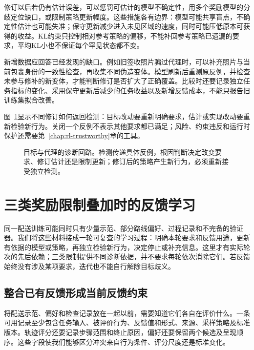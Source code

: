修订以后若仍有估计误差，可以惩罚可估计的模型不确定性，用多个奖励模型的分歧定位缺口，或限制策略更新幅度。这些措施各有边界：模型可能共享盲点，不确定性估计也可能失准；保守更新减少进入未见区域的速度，同时可能压低原本可获得的收益。KL约束只控制相对参考策略的偏移，不能补回参考策略已遗漏的要求，平均KL小也不保证每个罕见状态都不变。

新增数据应回答已经发现的缺口。例如旧签收照片骗过代理时，可以补充照片与当前包裹身份的一致性检查，再收集不同伪造变体。模型刷新后重测原反例，并检查未参与修补的新变体，才能判断修订是否扩大了正确覆盖。比较时还要记录独立任务指标的变化、采用保守更新后减少的任务收益以及新增反馈成本，不能只报告旧训练集拟合改善。

图~\ref{fig:rl-reward-revision}显示不同修订如何返回检测：目标改动要重新明确要求，估计或实现改动要重新检验新行为。关闭一个反例不表示其他要求都已满足；风险、约束违反和运行时保护还需要第~\ref{chap:rl-trustworthy}章的工具。

\begin{figure}[htbp]
  \centering
  
  \caption{目标与代理的诊断回路。检测传递具体反例，根因判断决定改变要求、修订估计还是限制更新；修订后的策略产生新行为，必须重新接受独立检测。}
  \label{fig:rl-reward-revision}
\end{figure}

\section{三类奖励限制叠加时的反馈学习}
\label{sec:rl-reward-loop}

同一配送训练可能同时只有少量示范、部分路线偏好、过程记录和不完备的验证器。我们将这些材料接成一轮可复查的学习过程：明确本轮要求和反馈用途，更新有依据的模型或策略，再独立检验新行为，决定停止或补充信息。这里才有实际轮次的先后依赖；三类限制提供不同诊断依据，并不要求每轮依次消除它们。若反馈始终没有涉及某项要求，迭代也不能自行解除目标歧义。

\subsection{整合已有反馈形成当前反馈约束}
\label{sec:rl-reward-integration}

将配送示范、偏好和检查记录放在一起以前，需要知道它们各自在评价什么。一条可用记录至少包含任务输入、被评价行为、反馈值和形式、来源、采样策略及标准版本。轨迹评分还要记录步骤范围和终止原因，偏好还要保留两个候选及呈现顺序。这些字段使我们能够区分冲突来自行为条件、评分尺度还是标准变化。


